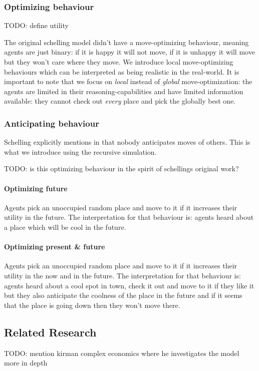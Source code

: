 \subsubsection{Optimizing behaviour}
TODO: define utility

The original schelling model didn't have a move-optimizing behaviour, meaning agents are just binary: if it is happy it will not move, if it is unhappy it will move but they won't care where they move. We introduce local move-optimizing behaviours which can be interpreted as being realistic in the real-world. It is important to note that we focus on \textit{local} instead of \textit{global} move-optimization: the agents are limited in their reasoning-capabilities and have limited information available: they cannot check out \textit{every} place and pick the globally best one.\\

\subsubsection{Anticipating behaviour}
Schelling explicitly mentions in \cite{schelling_dynamic_1971} that nobody anticipates moves of others. This is what we introduce using the recursive simulation.

TODO: is this optimizing behaviour in the spirit of schellings original work? 

\paragraph{Optimizing future} Agents pick an unoccupied random place and move to it if it increases their utility in the future. The interpretation for that behaviour is: agents heard about a place which will be cool in the future.

\paragraph{Optimizing present \& future} Agents pick an unoccupied random place and move to it if it increases their utility in the now and in the future. The interpretation for that behaviour is: agents heard about a cool spot in town, check it out and move to it if they like it but they also anticipate the coolness of the place in the future and if it seems that the place is going down then they won't move there.

\subsection{Related Research}
TODO: \cite{kirman_complex_2010} mention kirman complex economics where he investigates the model more in depth
